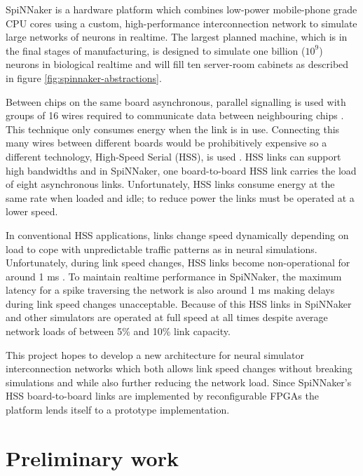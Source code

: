	SpiNNaker is a hardware platform which combines low-power mobile-phone grade
	CPU cores using a custom, high-performance interconnection network to simulate
	large networks of neurons in realtime. The largest planned machine, which is
	in the final stages of manufacturing, is designed to simulate one billion
	($10^9$) neurons in biological realtime \cite{navaridas09} and will fill ten
	server-room cabinets as described in figure \ref{fig:spinnaker-abstractions}.
	
	Between chips on the same board asynchronous, parallel signalling is used with
	groups of 16 wires required to communicate data between neighbouring chips
	\cite{bainbridge02}. This technique only consumes energy when the link is in
	use. Connecting this many wires between different boards would be
	prohibitively expensive so a different technology, High-Speed Serial (HSS), is
	used \cite{athavale05}. HSS links can support high bandwidths and in
	SpiNNaker, one board-to-board HSS link carries the load of eight asynchronous
	links.  Unfortunately, HSS links consume energy at the same rate when loaded
	and idle; to reduce power the links must be operated at a lower speed.
	
	In conventional HSS applications, links change speed dynamically depending on
	load \cite{infinibandta08} to cope with unpredictable traffic patterns as in
	neural simulations. Unfortunately, during link speed changes, HSS links become
	non-operational for around 1 ms \cite{xilinx14}. To maintain realtime
	performance in SpiNNaker, the maximum latency for a spike traversing the
	network is also around 1 ms making delays during link speed changes
	unacceptable. Because of this HSS links in SpiNNaker and other simulators are
	operated at full speed at all times despite average network loads of between
	5\% and 10\% \cite{moore12,navaridas09} link capacity.
	
	This project hopes to develop a new architecture for neural simulator
	interconnection networks which both allows link speed changes without breaking
	simulations and while also further reducing the network load. Since
	SpiNNaker's HSS board-to-board links are implemented by reconfigurable FPGAs
	the platform lends itself to a prototype implementation.

\section{Preliminary work}
	
